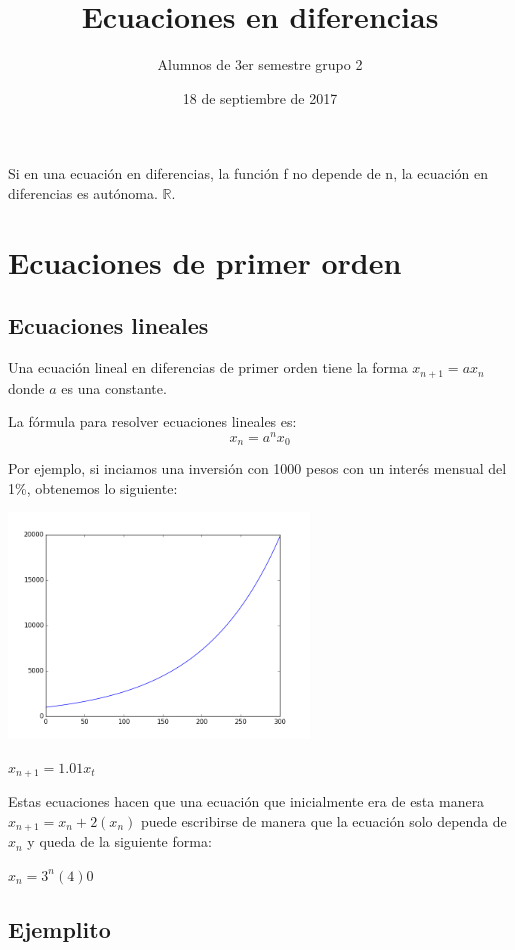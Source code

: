 \documentclass{article}
\title{Ecuaciones en diferencias}
\author{Alumnos de 3er semestre grupo 2}
\date{18 de septiembre de 2017}
\begin{document}
\maketitle

Si en una ecuación en diferencias, la función f no depende de n, la ecuación en diferencias es autónoma. $\mathbb{R}$.

\section{Ecuaciones de primer orden}

\subsection{Ecuaciones lineales}

Una ecuación lineal en diferencias de primer orden tiene la forma $x_{n+1}=ax_n$ donde $a$ es una constante. 

La fórmula para resolver ecuaciones lineales es:
\begin{equation}
  \label{lineal}
  x_n=a^nx_0
\end{equation}

Por ejemplo, si inciamos una inversión con 1000 pesos con un interés mensual del 1\%, obtenemos lo siguiente:

\begin{center}
  \includegraphics[width=8cm]{inversion.png}
\end{center}


$x_{n+1}=1.01x_t$

Estas ecuaciones hacen que una ecuación que inicialmente era de esta manera $x_{n+1}=x_n+2(x_n)$ puede escribirse de manera que la ecuación solo dependa de $x_n$ y queda de la siguiente forma:

$x_n=3^n(4)$0     

\subsection{Ejemplito}
\end{document}
